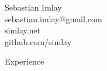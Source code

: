 \documentclass[9pt]{article}
\newenvironment{changemargin}[2]{%
  \begin{list}{}{%
    \setlength{\topsep}{0pt}%
    \setlength{\leftmargin}{#1}%
    \setlength{\rightmargin}{#2}%
    \setlength{\listparindent}{\parindent}%
    \setlength{\itemindent}{\parindent}%
    \setlength{\parsep}{\parskip}%
  }%
  \item[]}{\end{list}
}
\newcommand{\lineover}{
    \begin{changemargin}{-0.05in}{-0.05in}
        \vspace*{-8pt}
        \hrulefill \\
        \vspace*{-2pt}
    \end{changemargin}
}
\newcommand{\header}[1]{
    \begin{changemargin}{-0.5in}{-0.5in}
        {\large #1}\\
        \lineover
    \end{changemargin}
}
\newcommand{\contact}[4]{
    \begin{changemargin}{-0.5in}{-0.5in}
        \begin{center}
            {\Large {#1}}\\ \smallskip
            {#2}\\ \smallskip
            {#3}
        \end{center}
    \end{changemargin}
}
\begin{document}

\begin{changemargin}{-0.5in}{-0.5in}
    \begin{center}
        {\Large Sebastian Imlay}\\ \smallskip
        {sebastian.imlay@gmail.com}\\ \smallskip
        {simlay.net}\\ \smallskip
        {github.com/simlay}
    \end{center}
\end{changemargin}


\header{Experience}
\end{document}
